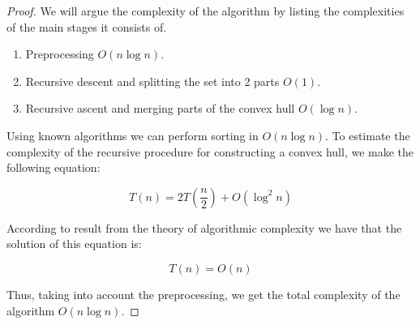 \documentclass[a4paper,UKenglish,cleveref, autoref]{socg-lipics-v2019}
\begin{document}
	\begin{proof}
		We will argue the complexity of the algorithm by listing the complexities of the main stages it consists of.
		
		\begin{enumerate}
			\item
			Preprocessing $O(n\log n)$.
			\item
			Recursive descent and splitting the set into 2 parts $O(1)$.
			\item
			Recursive ascent and merging parts of the convex hull $O(\log n)$.
		\end{enumerate}
		
		Using known algorithms we can perform sorting in $O(n\log n)$. To estimate the complexity of the recursive procedure for constructing a convex hull, we make the following equation:
		
		\begin{equation}
		T(n) = 2T(\frac{n}{2}) + O(\log^2 n)
		\end{equation}
		
		According to result from the theory of algorithmic complexity we have that the solution of this equation is:
		
		\begin{equation}
		T(n)=O(n)
		\end{equation}
		
		Thus, taking into account the preprocessing, we get the total complexity of the algorithm $O(n\log n)$.
	\end{proof}
	
\end{document}
